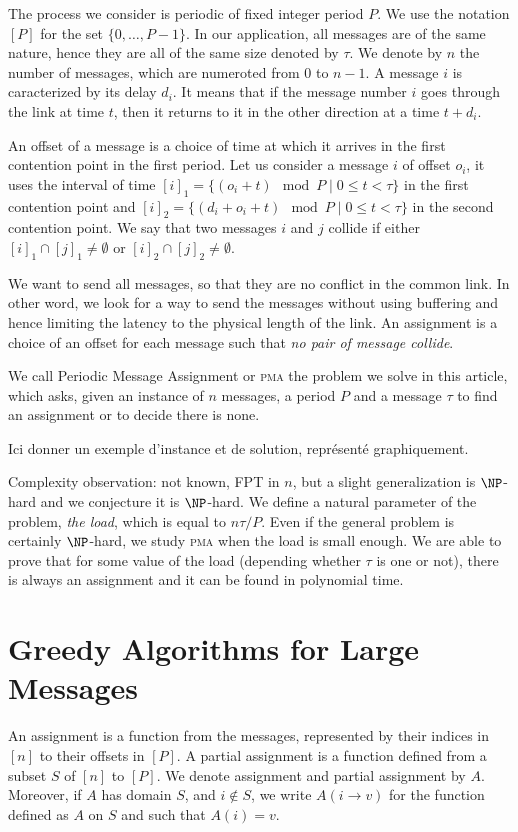 \documentclass[10pt, conference, letterpaper]{IEEEtran}
\newcommand\pma{\textsc{pma}\xspace}
\begin{document}
The process we consider is periodic of fixed integer period $P$. We use the notation $[P]$ for the set $\{0,\dots,P-1\}$. In our application, all messages are of the same nature, hence they are all of the same size denoted by $\tau$. We denote by $n$ the number of messages, which are numeroted from $0$ to $n-1$. A message $i$ is caracterized by its 
delay $d_i$. It means that if the message number $i$ goes through the link at time $t$, then it returns to it in the other direction at a time $t + d_i$. 

An offset of a message is a choice of time at which it arrives
in the first contention point in the first period. Let us consider a message $i$
of offset $o_i$, it uses the interval of time $[i]_1 = \{ (o_i + t) \mod P \mid 0 \leq t < \tau \}$ in the first contention point and $[i]_2 = \{ (d_i + o_i + t) \mod P \mid 0 \leq t < \tau \}$ in the second contention point. We say that two messages $i$ and $j$ collide if either $[i]_1 \cap [j]_1 \neq \emptyset $ or $[i]_2 \cap [j]_2 \neq \emptyset $.


We want to send all messages, so that they are no conflict in the common link.
In other word, we look for a way to send the messages without using buffering and 
hence limiting the latency to the physical length of the link. An assignment is a
choice of an offset for each message such that \emph{no pair of message collide}.

We call Periodic Message Assignment or \pma the problem we solve in this article,
which asks, given an instance of $n$ messages, a period $P$ and a message $\tau$ to find 
an assignment or to decide there is none.

Ici donner un exemple d'instance et de solution, représenté graphiquement.

Complexity observation: not known, FPT in $n$, but a slight generalization is $\NP$-hard and
we conjecture it is $\NP$-hard.
We define a natural parameter of the  problem, \emph{the load}, which is equal
to $n \tau /P$. Even if the general problem is certainly $\NP$-hard, we study \pma
when the load is small enough. We are able to prove that for some value of the load
(depending whether $\tau$ is one or not), there is always an assignment and it can be found in polynomial time.

\section{Greedy Algorithms for Large Messages}

An assignment is a function from the messages, represented by their indices in $[n]$
to their offsets in $[P]$.  
A partial assignment is a function defined from a subset $S$ of $[n]$ to $[P]$.
We denote assignment and partial assignment by $A$. Moreover, if $A$ has domain 
$S$, and $i \notin S$, we write $A(i \rightarrow v)$ for the function defined as 
$A$ on $S$ and such that $A(i) = v$.
\end{document}
